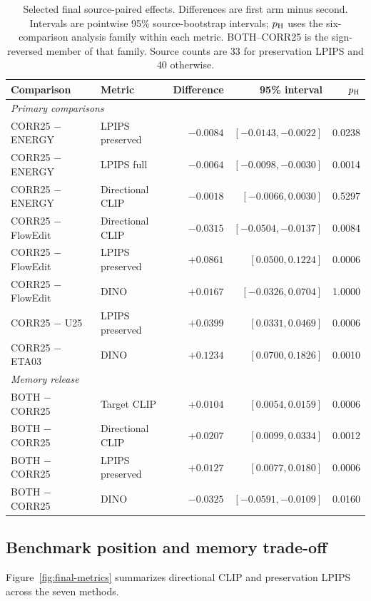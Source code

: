 \begin{table}[t]
\centering\footnotesize
\caption{Selected final source-paired effects. Differences are first arm minus second. Intervals are pointwise 95\% source-bootstrap intervals; $p_{\rm H}$ uses the six-comparison analysis family within each metric. BOTH--CORR25 is the sign-reversed member of that family. Source counts are 33 for preservation LPIPS and 40 otherwise.}
\label{tab:final-paired}
\setlength{\tabcolsep}{5pt}
\begin{tabular}{llrrr}
\toprule
Comparison & Metric & Difference & 95\% interval & $p_{\rm H}$\\
\midrule
\multicolumn{5}{l}{\textit{Primary comparisons}}\\
CORR25 $-$ ENERGY & LPIPS preserved & $-0.0084$ & $[-0.0143,-0.0022]$ & 0.0238\\
CORR25 $-$ ENERGY & LPIPS full & $-0.0064$ & $[-0.0098,-0.0030]$ & 0.0014\\
CORR25 $-$ ENERGY & Directional CLIP & $-0.0018$ & $[-0.0066,0.0030]$ & 0.5297\\
CORR25 $-$ FlowEdit & Directional CLIP & $-0.0315$ & $[-0.0504,-0.0137]$ & 0.0084\\
CORR25 $-$ FlowEdit & LPIPS preserved & $+0.0861$ & $[0.0500,0.1224]$ & 0.0006\\
CORR25 $-$ FlowEdit & DINO & $+0.0167$ & $[-0.0326,0.0704]$ & 1.0000\\
CORR25 $-$ U25 & LPIPS preserved & $+0.0399$ & $[0.0331,0.0469]$ & 0.0006\\
CORR25 $-$ ETA03 & DINO & $+0.1234$ & $[0.0700,0.1826]$ & 0.0010\\
\midrule
\multicolumn{5}{l}{\textit{Memory release}}\\
BOTH $-$ CORR25 & Target CLIP & $+0.0104$ & $[0.0054,0.0159]$ & 0.0006\\
BOTH $-$ CORR25 & Directional CLIP & $+0.0207$ & $[0.0099,0.0334]$ & 0.0012\\
BOTH $-$ CORR25 & LPIPS preserved & $+0.0127$ & $[0.0077,0.0180]$ & 0.0006\\
BOTH $-$ CORR25 & DINO & $-0.0325$ & $[-0.0591,-0.0109]$ & 0.0160\\
\bottomrule
\end{tabular}
\end{table}

\subsection{Benchmark position and memory trade-off}
Figure~\ref{fig:final-metrics} summarizes directional CLIP and preservation LPIPS across the seven methods.

